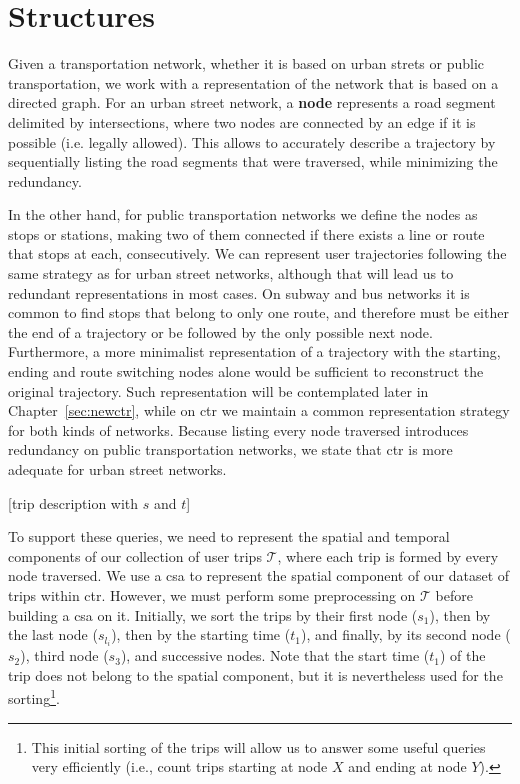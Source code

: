 \section{Structures}
Given a transportation network, whether it is based on urban strets or public transportation, we work with a representation of the network that is based on a directed graph. For an urban street network, a \textbf{node} represents a road segment delimited by intersections, where two nodes are connected by an edge if it is possible (i.e. legally allowed). This allows to accurately describe a trajectory by sequentially listing the road segments that were traversed, while minimizing the redundancy.

In the other hand, for public transportation networks we define the nodes as stops or stations, making two of them connected if there exists a line or route that stops at each, consecutively. We can represent user trajectories following the same strategy as for urban street networks, although that will lead us to redundant representations in most cases. On subway and bus networks it is common to find stops that belong to only one route, and therefore must be either the end of a trajectory or be followed by the only possible next node. Furthermore, a more minimalist representation of a trajectory with the starting, ending and route switching nodes alone would be sufficient to reconstruct the original trajectory. Such representation will be contemplated later in Chapter~\ref{sec:newctr}, while on \gls{ctr} we maintain a common representation strategy for both kinds of networks. Because listing every node traversed introduces redundancy on public transportation networks, we state that \gls{ctr} is more adequate for urban street networks.

[trip description with $s$ and $t$]

To support these queries, we need to represent the spatial and temporal components of our collection of user trips $\mathcal{T}$, where each trip is formed by every node traversed. We use a \gls{csa} to represent the spatial component of our dataset of trips within \gls{ctr}. However, we must perform some preprocessing on $\mathcal{T}$ before building a \gls{csa} on it. Initially, we sort the trips by their first node ($s_1$), then by the last node ($s_{l_i}$), then by the starting time ($t_1$), and finally, by its second node ($s_2$), third node ($s_3$), and successive nodes. Note that the start time ($t_1$) of the trip does not belong to the spatial component, but it is nevertheless used for the sorting\footnote{This initial sorting of the trips will allow us to answer some useful queries very efficiently  (i.e., count trips starting at node $X$ and ending at node $Y$).}.

